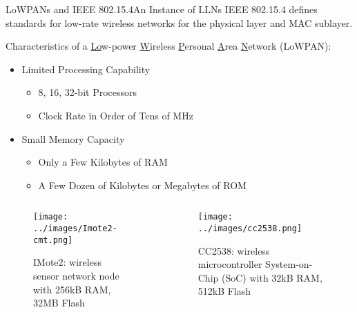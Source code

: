 \documentclass[10pt]{beamer}
\begin{document}
\begin{frame}{LoWPANs and IEEE 802.15.4}{An Instance of LLNs}
    IEEE 802.15.4\cite{9144691} defines standards for low-rate wireless networks for the physical layer and MAC sublayer.

    Characteristics of a \underline{Lo}w-power \underline{W}ireless \underline{P}ersonal \underline{A}rea \underline{N}etwork (LoWPAN)\cite{rfc6568}:
    \begin{itemize}
        \item Limited Processing Capability
            \begin{itemize}
                \item 8, 16, 32-bit Processors
                \item Clock Rate in Order of Tens of MHz
            \end{itemize}
        \item Small Memory Capacity
            \begin{itemize}
                \item Only a Few Kilobytes of RAM
                \item A Few Dozen of Kilobytes or Megabytes of ROM
            \end{itemize}
    \end{itemize}
    \vspace*{-8mm}
    \begin{columns}
        \begin{column}{0.5\textwidth}
            \begin{figure}[htpb]
                \centering
                \texttt{[image: ../images/Imote2-cmt.png]}
                \caption{IMote2: wireless sensor network node\cite{imote2cmt} with 256kB RAM, 32MB Flash}
            \end{figure}
        \end{column}
        \begin{column}{0.5\textwidth}
            \begin{figure}[htpb]
                \centering
                \texttt{[image: ../images/cc2538.png]}
                \caption{CC2538: wireless microcontroller System-on-Chip (SoC) with 32kB RAM, 512kB Flash\cite{cc2538}}
            \end{figure}
        \end{column}
    \end{columns}
\end{frame}
\end{document}
